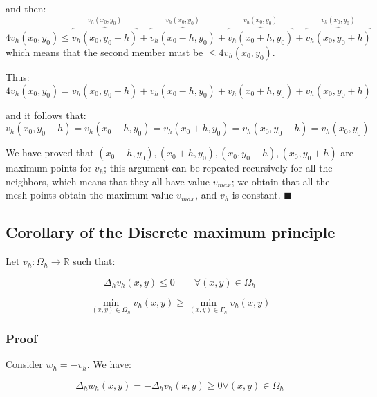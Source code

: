 and then:
\begin{equation*}
4 v_h(x_0, y_0) \le \overbrace{v_h(x_0, y_0 - h)}^{v_h (x_0, y_0)} + \overbrace{v_h(x_0 - h, y_0)}^{v_h (x_0, y_0)} + \overbrace{v_h(x_0 + h, y_0)}^{v_h (x_0, y_0)} + \overbrace{v_h(x_0, y_0 + h)}^{v_h (x_0, y_0)}
\end{equation*}
which means that the second member must be $\le 4 v_h (x_0, y_0)$.

Thus:
\begin{equation*}
4 v_h(x_0, y_0) = v_h(x_0, y_0 - h) + v_h(x_0 - h, y_0) + v_h(x_0 + h, y_0) + v_h(x_0, y_0 + h)
\end{equation*}

and it follows that:
\begin{equation*}
v_h(x_0, y_0 - h) = v_h(x_0 - h, y_0) = v_h(x_0 + h, y_0) = v_h(x_0, y_0 + h) = v_h(x_0, y_0)
\end{equation*}

We have proved that $(x_0 - h, y_0), (x_0 + h, y_0), (x_0, y_0 - h), (x_0, y_0 + h)$ are maximum points for $v_h$; this argument can be repeated recursively for all the neighbors, which means that they all have value $v_{max}$; we obtain that all the mesh points obtain the maximum value $v_{max}$, and $v_h$ is constant. $\blacksquare$

\subsection{Corollary of the Discrete maximum principle}

Let $v_h: \overline{\Omega}_h \rightarrow \mathbb{R}$ such that:

\begin{equation*}
\Delta_h v_h (x,y) \le 0 \qquad \forall (x, y) \in \Omega_h
\end{equation*}

\begin{equation*}
\min_{(x,y) \in \Omega_h} v_h(x, y) \ge \min_{(x,y) \in \Gamma_h} v_h(x, y) 
\end{equation*}


\subsubsection{Proof}
Consider $w_h = - v_h$. We have:

\begin{equation*}
\Delta_h w_h (x, y) = - \Delta_h v_h (x, y) \ge 0 \forall (x, y) \in \Omega_h
\end{equation*}

